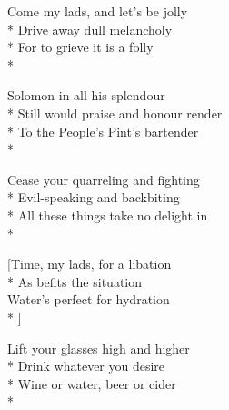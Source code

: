 

\versemark
Come my lads, and let’s be jolly\\*
Drive away dull melancholy\\*
For to grieve it is a folly\\*
\vin{}



\versemark
Solomon in all his splendour\\*
Still would praise and honour render\\*
To the People’s Pint’s bartender\\*
\vin{}

\versemark
Cease your quarreling and fighting\\*
Evil-speaking and backbiting\\*
All these things take no delight in\\*
\vin{}


[Time, my lads, for a libation\\*
As befits the situation\\
Water’s perfect for hydration\\*
\vin{}]

\versemark
Lift your glasses high and higher\\*
Drink whatever you desire\\*
Wine or water, beer or cider\\*
\vin{}

